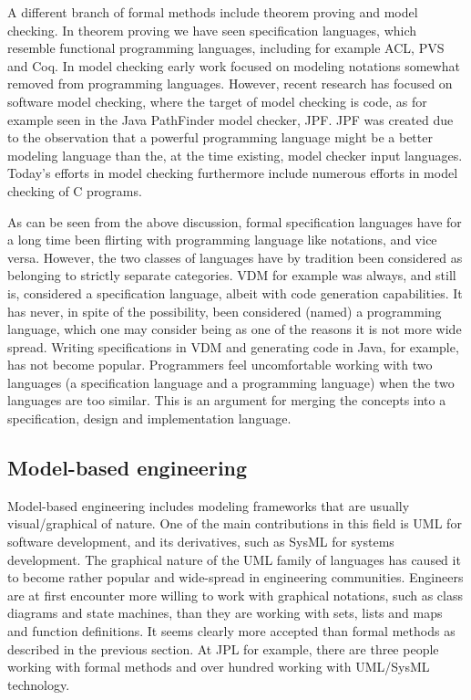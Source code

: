A different branch of formal methods include theorem proving and 
model checking. In theorem proving we have seen specification 
languages, which resemble functional programming languages, 
including for example ACL, PVS and Coq. In model checking early 
work focused on modeling notations somewhat removed from 
programming languages. However, recent research has focused on 
software model checking, where the target of model checking is 
code, as for example seen in the Java PathFinder model checker, 
JPF. JPF was created due to the observation that a powerful 
programming language might be a better modeling language than the, 
at the time existing, model checker input languages. Today’s 
efforts in model checking furthermore include numerous efforts in 
model checking of C programs.

As can be seen from the above discussion, formal specification 
languages have for a long time been flirting with programming 
language like notations, and vice versa. However, the two classes of languages have by tradition been considered as belonging to 
strictly separate categories. VDM for example was always, and still 
is, considered a specification language, albeit with code 
generation capabilities. It has never, in spite of the possibility, 
been considered (named) a programming language, which one may 
consider being as one of the reasons it is not more wide spread. 
Writing specifications in VDM and generating code in Java, for 
example, has not become popular. Programmers feel uncomfortable 
working with two languages (a specification language and  a 
programming language) when the two languages are too similar. This 
is an argument for merging the concepts into a  specification, 
design and implementation language.

\subsection{Model-based engineering}

Model-based engineering includes modeling frameworks that are 
usually visual/graphical of nature. One of the main contributions 
in this field is UML for software development, and its derivatives, 
such as SysML for systems development. The graphical nature of the 
UML family of languages has caused it to become rather popular and 
wide-spread in engineering communities. Engineers are at first 
encounter more willing to work with graphical notations, such as 
class diagrams and state machines, than they are working with sets, 
lists and maps and function definitions. It seems clearly more 
accepted than formal methods as described in the previous section. 
At JPL for example, there are three people working with formal 
methods and over hundred working with UML/SysML technology. 

